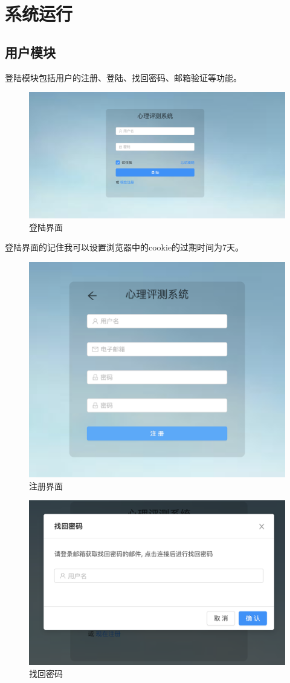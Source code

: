 \section{系统运行}

\subsection{用户模块}

登陆模块包括用户的注册、登陆、找回密码、邮箱验证等功能。

\begin{figure}[thbp!]
	\centering
	\includegraphics[width=0.7\linewidth]{figure/login}
	\caption{登陆界面}
	\label{fig:login}
\end{figure}

登陆界面的记住我可以设置浏览器中的cookie的过期时间为7天。

\begin{figure}[thbp!]
	\centering
	\includegraphics[width=0.7\linewidth]{figure/register}
	\caption{注册界面}
	\label{fig:register}
\end{figure}

\begin{figure}[thbp!]
	\centering
	\includegraphics[width=0.6\linewidth]{figure/find_password}
	\caption{找回密码}
	\label{fig:find_password}
\end{figure}


